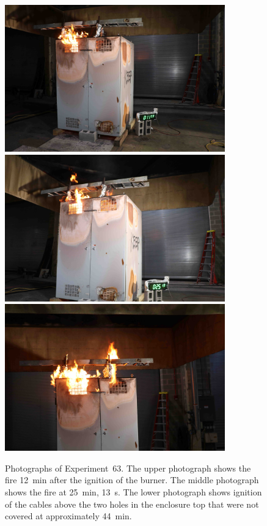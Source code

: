 \begin{figure}[p]
\centering
\includegraphics[height=2.50in]{../FIGURES/Test_63_11_min_59_s} \\ \vspace{0.1in}
\includegraphics[height=2.50in]{../FIGURES/Test_63_25_min_13_s} \\ \vspace{0.1in}
\includegraphics[height=2.50in]{../FIGURES/Test_63_ignition}
\caption[Photographs of Experiment~63]{Photographs of Experiment~63. The upper photograph shows the fire 12~min after the ignition of the burner. The middle photograph shows the fire at 25~min, 13~s. The lower photograph shows ignition of the cables above the two holes in the enclosure top that were not covered at approximately 44~min.}
\label{fig:Test_63_photos}
\end{figure}


